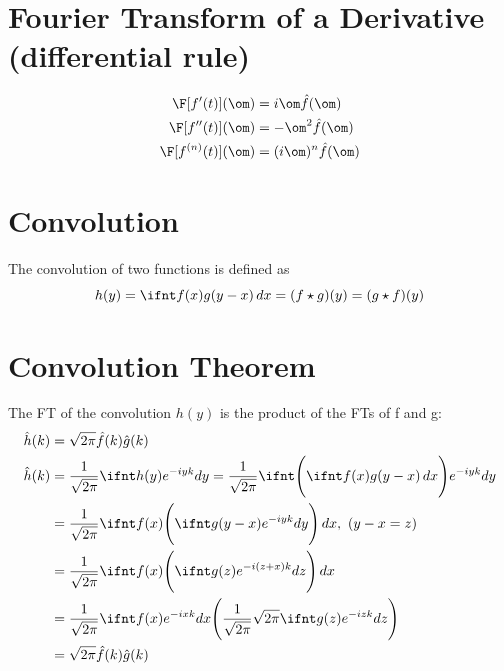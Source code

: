 \documentclass[a4paper, 11pt, normalem]{report}
\begin{document}
\section{Fourier Transform of a Derivative (differential rule)}
\begin{align*}
    \F[f'(t)](\om) &= i\om \hat{f}(\om) \\
    \F[f''(t)](\om) &= -\om^2 \hat{f}(\om) \\
    \F[f^{(n)}(t)](\om) &= (i\om)^n \hat{f}(\om)
\end{align*}

\section{Convolution}
The convolution of two functions is defined as
\begin{equation*}
    h(y) = \ifnt f(x)g(y - x)\,dx = (f \star g)(y) = (g \star f)(y)
\end{equation*}

\section{Convolution Theorem}
The FT of the convolution $h(y)$ is the product of the FTs of f and g:
\begin{align*}
    \hat{h}(k) &= \sqrt{2\pi} \hat{f}(k) \hat{g}(k) \\
    \hat{h}(k) &= \frac{1}{\sqrt{2\pi}} \ifnt h(y)e^{-iyk}dy = \frac{1}{\sqrt{2\pi}} \ifnt \Bigg(\ifnt f(x)g(y - x)\,dx\Bigg)e^{-iyk}dy \\
    &= \frac{1}{\sqrt{2\pi}} \ifnt f(x) \Bigg(\ifnt g(y - x)e^{-iyk}dy\Bigg)\,dx, ~ (y - x = z) \\
    &= \frac{1}{\sqrt{2\pi}} \ifnt f(x) \Bigg(\ifnt g(z)e^{-i(z + x)k}dz\Bigg)\,dx \\
    &= \frac{1}{\sqrt{2\pi}} \ifnt f(x)e^{-ixk}dx \Bigg(\frac{1}{\sqrt{2\pi}}\sqrt{2\pi} \ifnt g(z)e^{-izk}dz \Bigg) \\
    &= \sqrt{2\pi} \hat{f}(k) \hat{g}(k)
\end{align*}
\end{document}
